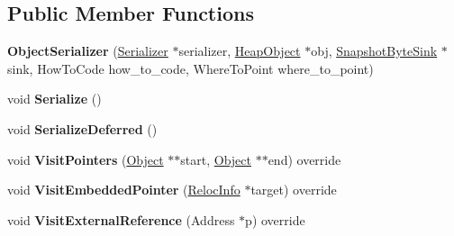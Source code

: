 \subsection*{Public Member Functions}
\begin{DoxyCompactItemize}
\item 
{\bfseries Object\+Serializer} (\hyperlink{classv8_1_1internal_1_1_serializer}{Serializer} $\ast$serializer, \hyperlink{classv8_1_1internal_1_1_heap_object}{Heap\+Object} $\ast$obj, \hyperlink{classv8_1_1internal_1_1_snapshot_byte_sink}{Snapshot\+Byte\+Sink} $\ast$sink, How\+To\+Code how\+\_\+to\+\_\+code, Where\+To\+Point where\+\_\+to\+\_\+point)\hypertarget{classv8_1_1internal_1_1_serializer_1_1_object_serializer_a8125b62ec7355cbc5b26389da3e112a0}{}\label{classv8_1_1internal_1_1_serializer_1_1_object_serializer_a8125b62ec7355cbc5b26389da3e112a0}

\item 
void {\bfseries Serialize} ()\hypertarget{classv8_1_1internal_1_1_serializer_1_1_object_serializer_a828349a29e9fde5e7ddd3c32350c479a}{}\label{classv8_1_1internal_1_1_serializer_1_1_object_serializer_a828349a29e9fde5e7ddd3c32350c479a}

\item 
void {\bfseries Serialize\+Deferred} ()\hypertarget{classv8_1_1internal_1_1_serializer_1_1_object_serializer_a38c2c0ae3537fe25ec45162aeb077664}{}\label{classv8_1_1internal_1_1_serializer_1_1_object_serializer_a38c2c0ae3537fe25ec45162aeb077664}

\item 
void {\bfseries Visit\+Pointers} (\hyperlink{classv8_1_1internal_1_1_object}{Object} $\ast$$\ast$start, \hyperlink{classv8_1_1internal_1_1_object}{Object} $\ast$$\ast$end) override\hypertarget{classv8_1_1internal_1_1_serializer_1_1_object_serializer_ac07c5bb74001b260bfe04cf17f79023d}{}\label{classv8_1_1internal_1_1_serializer_1_1_object_serializer_ac07c5bb74001b260bfe04cf17f79023d}

\item 
void {\bfseries Visit\+Embedded\+Pointer} (\hyperlink{classv8_1_1internal_1_1_reloc_info}{Reloc\+Info} $\ast$target) override\hypertarget{classv8_1_1internal_1_1_serializer_1_1_object_serializer_a3dd234a37fccc603eb3aa6e468d8eeef}{}\label{classv8_1_1internal_1_1_serializer_1_1_object_serializer_a3dd234a37fccc603eb3aa6e468d8eeef}

\item 
void {\bfseries Visit\+External\+Reference} (Address $\ast$p) override\hypertarget{classv8_1_1internal_1_1_serializer_1_1_object_serializer_a153bb098ad3b150a795d10a83dfb5755}{}\label{classv8_1_1internal_1_1_serializer_1_1_object_serializer_a153bb098ad3b150a795d10a83dfb5755}


\end{DoxyCompactItemize}
